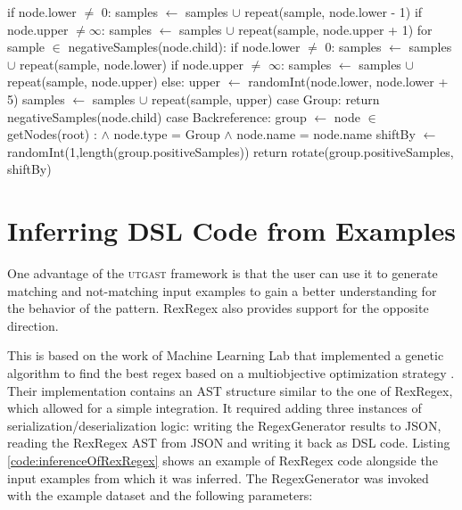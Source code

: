 \begin{pseudoCode}[title={Generating Negative Test Samples},breakable=true,label=code:verificationNegative]
        if node.lower $\neq$ 0:
          samples $\gets$ samples $\cup$ repeat(sample, node.lower - 1) 
        if node.upper $\neq \infty$:
          samples $\gets$ samples $\cup$ repeat(sample, node.upper + 1) %
      for sample $\in$ negativeSamples(node.child): %
        if node.lower $\neq$ 0:
          samples $\gets$ samples $\cup$ repeat(sample, node.lower)
        if node.upper $\neq$ $\infty$:
          samples $\gets$ samples $\cup$ repeat(sample, node.upper)
        else:
          upper $\gets$ randomInt(node.lower, node.lower + 5)
          samples $\gets$ samples $\cup$ repeat(sample, upper) %
    case Group:
      return negativeSamples(node.child)
    case Backreference:  %
      group $\gets$ node $\in$ getNodes(root) :
                        $\land$ node.type = Group 
                        $\land$ node.name = node.name
      shiftBy $\gets$ randomInt(1,length(group.positiveSamples))
      return rotate(group.positiveSamples, shiftBy) %
\end{pseudoCode}


\section{Inferring DSL Code from Examples} \label{sec:inferenceOfRexRegex}

One advantage of the \textsc{utgast} framework is that the user can use it to generate matching and not-matching input examples to gain a better understanding for the behavior of the pattern. RexRegex also provides support for the opposite direction.

This is based on the work of Machine Learning Lab that implemented a genetic algorithm to find the best regex based on a multiobjective optimization strategy \cite{bartoli2016inference}\cite{bartoli2016can}\cite{bartoli2015evolutionary}. Their implementation contains an AST structure similar to the one of RexRegex, which allowed for a simple integration. It required adding three instances of serialization/deserialization logic: writing the RegexGenerator results to JSON, reading the RexRegex AST from JSON and writing it back as DSL code.
Listing \ref{code:inferenceOfRexRegex} shows an example of RexRegex code alongside the input examples from which it was inferred. The RegexGenerator was invoked with the example dataset and the following parameters:


